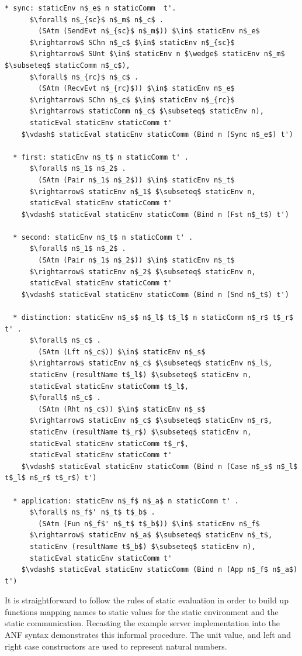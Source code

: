\documentclass[letterpaper, 11pt]{extarticle}
\begin{document}
\begin{lstlisting}[language=logic, mathescape]
  * sync: staticEnv n$_e$ n staticComm  t'.
      $\forall$ n$_{sc}$ n$_m$ n$_c$ . 
        (SAtm (SendEvt n$_{sc}$ n$_m$)) $\in$ staticEnv n$_e$
      $\rightarrow$ SChn n$_c$ $\in$ staticEnv n$_{sc}$ 
      $\rightarrow$ SUnt $\in$ staticEnv n $\wedge$ staticEnv n$_m$ $\subseteq$ staticComm n$_c$),
      $\forall$ n$_{rc}$ n$_c$ . 
        (SAtm (RecvEvt n$_{rc}$)) $\in$ staticEnv n$_e$
      $\rightarrow$ SChn n$_c$ $\in$ staticEnv n$_{rc}$ 
      $\rightarrow$ staticComm n$_c$ $\subseteq$ staticEnv n),
      staticEval staticEnv staticComm t'
    $\vdash$ staticEval staticEnv staticComm (Bind n (Sync n$_e$) t')

  * first: staticEnv n$_t$ n staticComm t' . 
      $\forall$ n$_1$ n$_2$ .
        (SAtm (Pair n$_1$ n$_2$)) $\in$ staticEnv n$_t$
      $\rightarrow$ staticEnv n$_1$ $\subseteq$ staticEnv n,
      staticEval staticEnv staticComm t'
    $\vdash$ staticEval staticEnv staticComm (Bind n (Fst n$_t$) t')

  * second: staticEnv n$_t$ n staticComm t' . 
      $\forall$ n$_1$ n$_2$ . 
        (SAtm (Pair n$_1$ n$_2$)) $\in$ staticEnv n$_t$
      $\rightarrow$ staticEnv n$_2$ $\subseteq$ staticEnv n,
      staticEval staticEnv staticComm t'
    $\vdash$ staticEval staticEnv staticComm (Bind n (Snd n$_t$) t')

  * distinction: staticEnv n$_s$ n$_l$ t$_l$ n staticComm n$_r$ t$_r$ t' . 
      $\forall$ n$_c$ . 
        (SAtm (Lft n$_c$)) $\in$ staticEnv n$_s$
      $\rightarrow$ staticEnv n$_c$ $\subseteq$ staticEnv n$_l$,
      staticEnv (resultName t$_l$) $\subseteq$ staticEnv n,
      staticEval staticEnv staticComm t$_l$,
      $\forall$ n$_c$ . 
        (SAtm (Rht n$_c$)) $\in$ staticEnv n$_s$
      $\rightarrow$ staticEnv n$_c$ $\subseteq$ staticEnv n$_r$, 
      staticEnv (resultName t$_r$) $\subseteq$ staticEnv n, 
      staticEval staticEnv staticComm t$_r$,
      staticEval staticEnv staticComm t'
    $\vdash$ staticEval staticEnv staticComm (Bind n (Case n$_s$ n$_l$ t$_l$ n$_r$ t$_r$) t')

  * application: staticEnv n$_f$ n$_a$ n staticComm t' . 
      $\forall$ n$_f$' n$_t$ t$_b$ . 
        (SAtm (Fun n$_f$' n$_t$ t$_b$)) $\in$ staticEnv n$_f$
      $\rightarrow$ staticEnv n$_a$ $\subseteq$ staticEnv n$_t$, 
      staticEnv (resultName t$_b$) $\subseteq$ staticEnv n),
      staticEval staticEnv staticComm t'
    $\vdash$ staticEval staticEnv staticComm (Bind n (App n$_f$ n$_a$) t')
\end{lstlisting}

It is straightforward to follow the rules of static evaluation in order to build up
functions mapping names to static values for the static environment
and the static communication.
Recasting the example server implementation into the ANF syntax demonstrates this informal procedure.
The unit value, and left and right case constructors are used to represent natural numbers.
\end{document}
